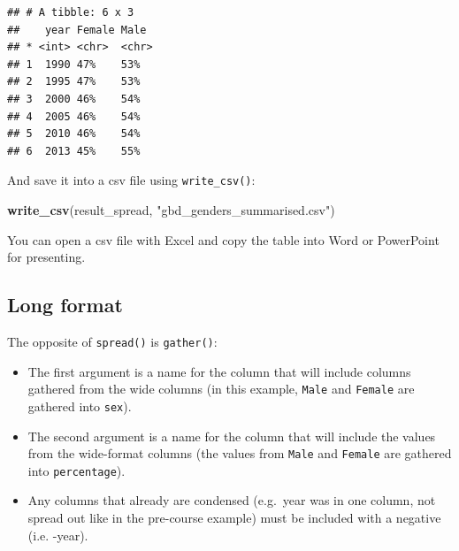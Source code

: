 \documentclass[]{book}
\makeatletter
\newenvironment{Shaded}{\begin{snugshade}}{\end{snugshade}}
\newcommand{\KeywordTok}[1]{\textcolor[rgb]{0.13,0.29,0.53}{\textbf{#1}}}
\newcommand{\DataTypeTok}[1]{\textcolor[rgb]{0.13,0.29,0.53}{#1}}
\newcommand{\DecValTok}[1]{\textcolor[rgb]{0.00,0.00,0.81}{#1}}
\newcommand{\StringTok}[1]{\textcolor[rgb]{0.31,0.60,0.02}{#1}}
\newcommand{\OperatorTok}[1]{\textcolor[rgb]{0.81,0.36,0.00}{\textbf{#1}}}
\newcommand{\NormalTok}[1]{#1}
\providecommand{\tightlist}{%
  \setlength{\itemsep}{0pt}\setlength{\parskip}{0pt}}
\newenvironment{kframe}{%
\medskip{}
\setlength{\fboxsep}{.8em}
 \def\at@end@of@kframe{}%
 \ifinner\ifhmode%
  \def\at@end@of@kframe{\end{minipage}}%
  \begin{minipage}{\columnwidth}%
 \fi\fi%
 \def\FrameCommand##1{\hskip\@totalleftmargin \hskip-\fboxsep
 \colorbox{shadecolor}{##1}\hskip-\fboxsep
     \hskip-\linewidth \hskip-\@totalleftmargin \hskip\columnwidth}%
 \MakeFramed {\advance\hsize-\width
   \@totalleftmargin\z@ \linewidth\hsize
   \@setminipage}}%
 {\par\unskip\endMakeFramed%
 \at@end@of@kframe}
\renewenvironment{Shaded}{\begin{kframe}}{\end{kframe}}
\makeatother
\begin{document}
\begin{Shaded}
\end{Shaded}

\begin{verbatim}
## # A tibble: 6 x 3
##    year Female Male 
## * <int> <chr>  <chr>
## 1  1990 47%    53%  
## 2  1995 47%    53%  
## 3  2000 46%    54%  
## 4  2005 46%    54%  
## 5  2010 46%    54%  
## 6  2013 45%    55%
\end{verbatim}

And save it into a csv file using \texttt{write\_csv()}:

\begin{Shaded}
\begin{Highlighting}[]
\KeywordTok{write_csv}\NormalTok{(result_spread, }\StringTok{"gbd_genders_summarised.csv"}\NormalTok{)}
\end{Highlighting}
\end{Shaded}

You can open a csv file with Excel and copy the table into Word or
PowerPoint for presenting.

\subsection{Long format}\label{long-format}

The opposite of \texttt{spread()} is \texttt{gather()}:

\begin{itemize}
\tightlist
\item
  The first argument is a name for the column that will include columns
  gathered from the wide columns (in this example, \texttt{Male} and
  \texttt{Female} are gathered into \texttt{sex}).
\item
  The second argument is a name for the column that will include the
  values from the wide-format columns (the values from \texttt{Male} and
  \texttt{Female} are gathered into \texttt{percentage}).
\item
  Any columns that already are condensed (e.g.~year was in one column,
  not spread out like in the pre-course example) must be included with a
  negative (i.e. -year).
\end{itemize}
\end{document}
